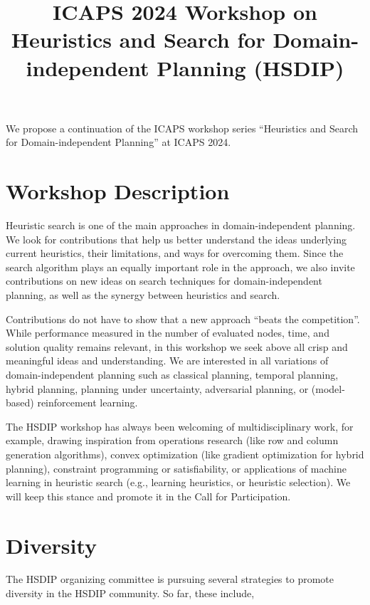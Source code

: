 \documentclass[10pt]{article}
\begin{document}
\title{ICAPS 2024 Workshop on Heuristics and Search for Domain-independent
Planning (HSDIP)%
}
\date{}

\author{}

\maketitle

\vspace{-2cm}


We propose a continuation of the ICAPS workshop series ``Heuristics
and Search for Domain-independent Planning'' at ICAPS 2024.

\section*{Workshop Description}
Heuristic search is one of the main approaches in domain-independent
planning.  We look for contributions that help us better
understand the ideas underlying current heuristics, their limitations,
and ways for overcoming them.
%
Since the search algorithm plays an equally important role in the
approach, we also invite contributions on new ideas on search
techniques for domain-independent planning, as well as the synergy
between heuristics and search.

Contributions do not have to show that a new approach ``beats the competition''.
While performance measured in the number of evaluated nodes, time, and solution
quality remains relevant, in this workshop we seek above all crisp and
meaningful ideas and understanding.
%
We are interested in all variations of domain-independent planning
such as classical planning, temporal planning, hybrid planning, planning under
uncertainty, adversarial planning, or (model-based) reinforcement learning.

The HSDIP workshop has always been welcoming of multidisciplinary work,
for example, drawing inspiration from operations research (like row and
column generation algorithms), convex optimization (like gradient
optimization for hybrid planning), constraint programming or
satisfiability, or applications of machine learning in heuristic search
(e.g., learning heuristics, or heuristic selection). We will keep this
stance and promote it in the Call for Participation.

\section*{Diversity}
The HSDIP organizing committee is pursuing several strategies to promote
diversity in the HSDIP community. So far, these include,
\end{document}
